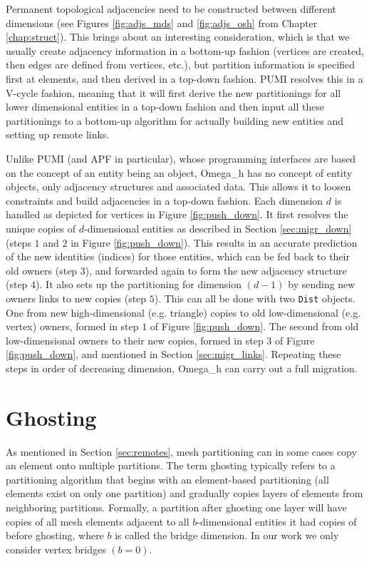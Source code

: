 Permanent topological adjacencies need to be constructed
between different dimensions (see Figures \ref{fig:adjs_mds} and
\ref{fig:adjs_osh} from Chapter \ref{chap:struct}).
This brings about an interesting consideration, which is that we
usually create adjacency information in a bottom-up fashion (vertices
are created, then edges are defined from vertices, etc.), but
partition information is specified first at elements, and then
derived in a top-down fashion.
PUMI resolves this in a V-cycle fashion, meaning that it will first
derive the new partitionings for all lower dimensional entities in a top-down
fashion and then input all these partitionings to a bottom-up algorithm
for actually building new entities and setting up remote links.

Unlike PUMI (and APF in particular), whose programming interfaces are based on the
concept of an entity being an object, Omega\_h has no concept of entity
objects, only adjacency structures and associated data.
This allows it to loosen constraints and build adjacencies in a top-down fashion.
Each dimension $d$ is handled as depicted for vertices in Figure \ref{fig:push_down}.
It first resolves the unique copies of
$d$-dimensional entities as described in Section \ref{sec:migr_down}
(steps $1$ and $2$ in Figure \ref{fig:push_down}).
This results in an accurate prediction of the new identities (indices)
for those entities, which can be fed back to
their old owners (step $3$), and forwarded
again to form the new adjacency structure (step $4$).
It also sets up the partitioning for dimension $(d-1)$ by sending
new owners links to new copies (step $5$).
This can all be done with two \texttt{Dist} objects.
One from new
high-dimensional (e.g. triangle) copies to old low-dimensional (e.g. vertex) owners,
formed in step $1$ of Figure \ref{fig:push_down}.
The second from old low-dimensional owners to their new copies,
formed in step $3$ of Figure \ref{fig:push_down}, and
mentioned in Section \ref{sec:migr_links}.
Repeating these steps in order of decreasing dimension, Omega\_h
can carry out a full migration.

\section{Ghosting}
\label{sec:ghost}

As mentioned in Section \ref{sec:remotes}, mesh partitioning can
in some cases copy an element onto multiple partitions.
The term ghosting typically refers to a partitioning algorithm
that begins with an element-based partitioning (all elements
exist on only one partition) and gradually copies layers of elements
from neighboring partitions.
Formally, a partition after ghosting one layer will have copies
of all mesh elements adjacent to all $b$-dimensional entities
it had copies of before ghosting, where $b$ is called the bridge dimension.
In our work we only consider vertex bridges $(b=0)$.


